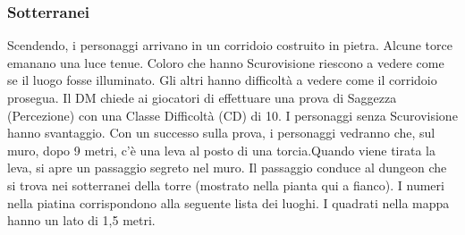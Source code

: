 \documentclass{article}
\begin{document}
            \subsubsection{Sotterranei}
Scendendo, i personaggi arrivano in un corridoio costruito in pietra. Alcune torce emanano una luce tenue. Coloro che hanno Scurovisione riescono a vedere come se il luogo fosse illuminato. Gli altri hanno difficoltà a vedere come il corridoio prosegua. Il DM chiede ai giocatori di effettuare una prova di Saggezza (Percezione) con una Classe Difficoltà (CD) di 10. I personaggi senza Scurovisione hanno svantaggio. Con un successo sulla prova, i personaggi vedranno che, sul muro, dopo 9 metri, c'è una leva al posto di una torcia.Quando viene tirata la leva, si apre un passaggio segreto nel muro. Il passaggio conduce al dungeon che si trova nei sotterranei della torre (mostrato nella pianta qui a fianco). I numeri nella piatina corrispondono alla seguente lista dei luoghi. I quadrati nella mappa hanno un lato di 1,5 metri.
\end{document}
